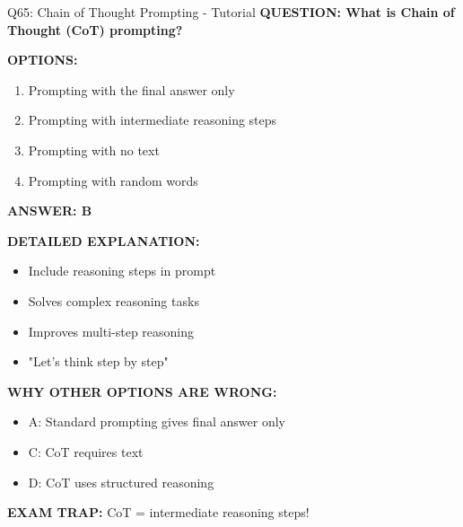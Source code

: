 \documentclass[8pt]{beamer}
\begin{document}
	
	\begin{frame}{Q65: Chain of Thought Prompting - Tutorial}
		\fontsize{6.5}{7.5}\selectfont
		\textbf{QUESTION: What is Chain of Thought (CoT) prompting?}
		
		\vspace{0.1cm}
		\textbf{OPTIONS:}
		\begin{enumerate}
			\item Prompting with the final answer only
			\item Prompting with intermediate reasoning steps
			\item Prompting with no text
			\item Prompting with random words
		\end{enumerate}
		
		\vspace{0.1cm}
		\textcolor{myblue}{\textbf{ANSWER: B}}
		
		\vspace{0.1cm}
		\textbf{DETAILED EXPLANATION:}
		\begin{itemize}
			\item Include reasoning steps in prompt
			\item Solves complex reasoning tasks
			\item Improves multi-step reasoning
			\item "Let's think step by step"
		\end{itemize}
		
		\vspace{0.1cm}
		\textcolor{myred}{\textbf{WHY OTHER OPTIONS ARE WRONG:}}
		\begin{itemize}
			\item \textcolor{myred}{A:} Standard prompting gives final answer only
			\item \textcolor{myred}{C:} CoT requires text
			\item \textcolor{myred}{D:} CoT uses structured reasoning
		\end{itemize}
		
		\textcolor{myred}{\textbf{EXAM TRAP:}} CoT = \textcolor{myblue}{intermediate reasoning steps}!
	\end{frame}
	
\end{document}
